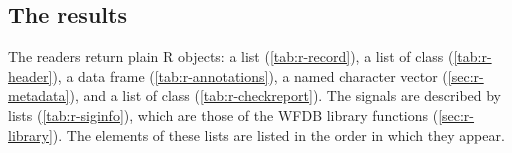 \subsection{The results}
\label{sec:r-results}

The readers return plain R objects:  a list
(\cref{tab:r-record}),  a list of class 
(\cref{tab:r-header}),  a data frame (\cref{tab:r-annotations}),
 a named character vector (\cref{sec:r-metadata}), and
 a list of class 
(\cref{tab:r-checkreport}). The signals are described by  lists
(\cref{tab:r-siginfo}), which are those of the WFDB library functions
(\cref{sec:r-library}). The elements of these lists are listed in the order in which they
appear.

